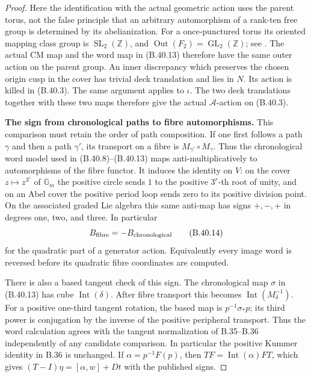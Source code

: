 \begin{proof}
Here the identification with the actual geometric action
uses the parent torus, not the false principle that an
arbitrary automorphism of a rank-ten free group is
determined by its abelianization.
For a once-punctured torus its oriented mapping class
group is $\operatorname{SL}_2(\mathbb Z)$, and
$\operatorname{Out}(F_2)=\operatorname{GL}_2(\mathbb Z)$;
see \citet[\S2.2.4, pp.~54--55; \S8.2.7,
pp.~234--235]{BFarbMargalit2012}.
The actual CM map and the word map in (B.40.13) therefore
have the same outer action on the parent group.
An inner discrepancy which preserves the chosen origin
cusp in the cover has trivial deck translation and lies
in $N$. Its action is killed in (B.40.3).
The same argument applies to $\iota$.
The two deck translations together with these two maps
therefore give the actual $\mathcal A$-action on
(B.40.3).

\par\smallskip\noindent\textbf{The sign from chronological paths to fibre automorphisms.}\enspace 
This comparison must retain the order of path composition.
If one first follows a path $\gamma$ and then a path
$\gamma'$, its transport on a fibre is
$M_{\gamma'}\circ M_\gamma$.
Thus the chronological word model used in
(B.40.8)--(B.40.13) maps anti-multiplicatively to
automorphisms of the fibre functor.
It induces the identity on $V$: on the cover
$z\mapsto z^{3^r}$ of $\mathbb G_m$ the positive circle
sends $1$ to the positive $3^r$-th root of unity, and
on an Abel cover the positive period loop sends zero
to its positive division point.
On the associated graded Lie algebra this same
anti-map has signs $+,-,+$ in degrees one, two, and three.
In particular
\[
       B_{\rm fibre}=-B_{\rm chronological}                  \tag{B.40.14}
\]
for the quadratic part of a generator action.
Equivalently every image word is reversed before its
quadratic fibre coordinates are computed.

There is also a based tangent check of this sign.
The chronological map $\sigma$ in (B.40.13) has cube
$\operatorname{Int}(\delta)$.
After fibre transport this becomes
$\operatorname{Int}(M_\delta^{-1})$.
For a positive one-third tangent rotation, the based
map is $p^{-1}\sigma_*p$; its third power is conjugation
by the inverse of the positive peripheral transport.
Thus the word calculation agrees with the tangent
normalization of B.35--B.36 independently of any
candidate comparison.
In particular the positive Kummer identity in B.36 is
unchanged. If $\alpha=p^{-1}F(p)$, then
$TF=\operatorname{Int}(\alpha)FT$, which gives
$(T-I)\eta=[\alpha,w]+Dt$ with the published signs.


\end{proof}
